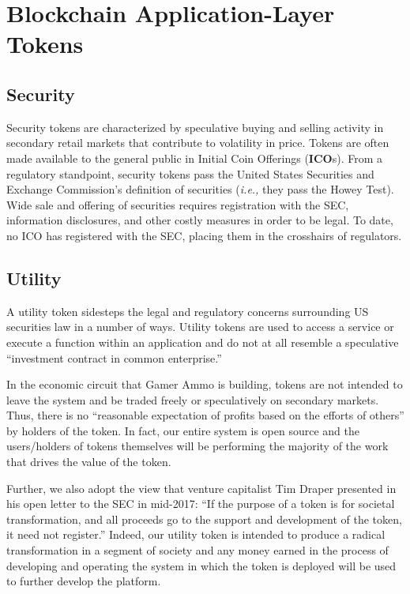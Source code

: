 \documentclass[11pt]{report}
\begin{document}
\section{Blockchain Application-Layer Tokens}\label{blockchain-application-layer-tokens}
\subsection{Security}\label{security-token}
Security tokens are characterized by speculative buying and selling activity in secondary retail markets that contribute to volatility in price. Tokens are often made available to the general public in Initial Coin Offerings (\textbf{ICO}s).\cite{what-is-an-ico} From a regulatory standpoint, security tokens pass the United States Securities and Exchange Commission's definition of securities (\textit{i.e.,} they pass the Howey Test\cite{howey-test}). Wide sale and offering of securities requires registration with the SEC, information disclosures, and other costly measures in order to be legal. To date, no ICO has registered with the SEC, placing them in the crosshairs of regulators.\cite{jay-clayton-testimony}
\subsection{Utility}\label{utility-token}
A utility token sidesteps the legal and regulatory concerns surrounding US securities law in a number of ways. Utility tokens are used to access a service or execute a function within an application and do not at all resemble a speculative ``investment contract in common enterprise.''\cite{defining-common-enterprise} \cite{investment-contract}

In the economic circuit that Gamer Ammo is building, tokens are not intended to leave the system and be traded freely or speculatively on secondary markets. Thus, there is no ``reasonable expectation of profits based on the efforts of others'' by holders of the token. In fact, our entire system is open source and the users/holders of tokens themselves will be performing the majority of the work that drives the value of the token.

Further, we also adopt the view that venture capitalist Tim Draper presented in his open letter to the SEC in mid-2017: ``If the purpose of a token is for societal transformation, and all proceeds go to the support and development of the token, it need not register.”\cite{tim-draper-tweet} Indeed, our utility token is intended to produce a radical transformation in a segment of society and any money earned in the process of developing and operating the system in which the token is deployed will be used to further develop the platform.
\end{document}
